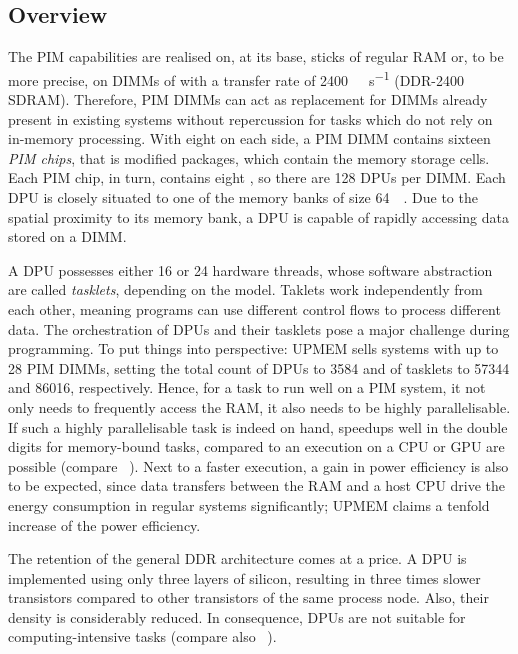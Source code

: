 \subsection{Overview}
\label{sec:prereq:arch:overview}

The \ac{PIM} capabilities are realised on, at its base, sticks of regular \ac{RAM} or, to be more precise, on \acp{DIMM} of   with a transfer rate of \qty{2400}{\mega\transfer\per\second} (\acs{DDR}-2400 \acs{SDRAM}).
Therefore, \ac{PIM} \acp{DIMM} can act as replacement for \acp{DIMM} already present in existing systems without repercussion for tasks which do not rely on in-memory processing.
With eight on each side, a \ac{PIM} \ac{DIMM} contains sixteen \emph{PIM chips}, that is modified  packages, which contain the memory storage cells.
Each \ac{PIM} chip, in turn, contains eight , so there are 128 \acp{DPU} per \ac{DIMM}.
Each \ac{DPU} is closely situated to one of the memory banks of size \qty{64}{\mebi\byte}.
Due to the spatial proximity to its memory bank, a \ac{DPU} is capable of rapidly accessing data stored on a \ac{DIMM}.

A \ac{DPU} possesses either 16 or 24 hardware threads, whose software abstraction are called \emph{tasklets}, depending on the model.
Taklets work independently from each other, meaning programs can use different control flows to process different data.
The orchestration of \acp{DPU} and their tasklets pose a major challenge during programming.
To put things into perspective:
UPMEM sells systems with up to 28 \ac{PIM} \acp{DIMM}, setting the total count of \acp{DPU} to \num{3584} and of tasklets to \num{57344} and \num{86016}, respectively.
Hence, for a task to run well on a \ac{PIM} system, it not only needs to frequently access the \ac{RAM}, it also needs to be highly parallelisable.
If such a highly parallelisable task is indeed on hand, speedups well in the double digits for memory-bound tasks, compared to an execution on a \ac{CPU} or \ac{GPU} are possible (compare \citeauthor{mutlu2022Benchmarking}~\cite{mutlu2022Benchmarking}).
Next to a faster execution, a gain in power efficiency is also to be expected, since data transfers between the \ac{RAM} and a host \ac{CPU} drive the energy consumption in regular systems significantly;
UPMEM claims a tenfold increase of the power efficiency.

The retention of the general \ac{DDR} architecture comes at a price.
A \ac{DPU} is implemented using only three layers of silicon, resulting in three times slower transistors compared to other transistors of the same process node.
Also, their density is considerably reduced.
In consequence, \acp{DPU} are not suitable for computing-intensive tasks (compare also \citeauthor{mutlu2022Benchmarking}~\cite{mutlu2022Benchmarking}).
